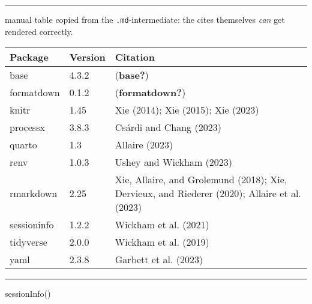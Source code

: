 \documentclass[
  letterpaper,
  DIV=11,
  numbers=noendperiod]{scrartcl}
\newenvironment{Shaded}{\begin{snugshade}}{\end{snugshade}}
\newcommand{\FunctionTok}[1]{\textcolor[rgb]{0.28,0.35,0.67}{#1}}
\newcommand{\NormalTok}[1]{\textcolor[rgb]{0.00,0.23,0.31}{#1}}
\begin{document}
\begin{center}\rule{0.5\linewidth}{0.5pt}\end{center}

manual table copied from the \texttt{.md}-intermediate: the cites
themselves \emph{can} get rendered correctly.

\begin{longtable}[]{@{}lll@{}}
\toprule\noalign{}
Package & Version & Citation \\
\midrule\noalign{}
\endhead
\bottomrule\noalign{}
\endlastfoot
base & 4.3.2 & (\textbf{base?}) \\
formatdown & 0.1.2 & (\textbf{formatdown?}) \\
knitr & 1.45 & Xie (2014); Xie (2015); Xie (2023) \\
processx & 3.8.3 & Csárdi and Chang (2023) \\
quarto & 1.3 & Allaire (2023) \\
renv & 1.0.3 & Ushey and Wickham (2023) \\
rmarkdown & 2.25 & Xie, Allaire, and Grolemund (2018); Xie, Dervieux,
and Riederer (2020); Allaire et al. (2023) \\
sessioninfo & 1.2.2 & Wickham et al. (2021) \\
tidyverse & 2.0.0 & Wickham et al. (2019) \\
yaml & 2.3.8 & Garbett et al. (2023) \\
\end{longtable}

\begin{center}\rule{0.5\linewidth}{0.5pt}\end{center}

\begin{Shaded}
\begin{Highlighting}[]
\FunctionTok{sessionInfo}\NormalTok{()}
\end{Highlighting}
\end{Shaded}
\end{document}
